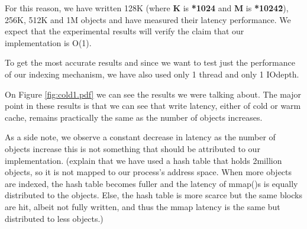 For this reason, we have written 128K (where \textbf{K} is \textbf{*1024} and 
\textbf{M} is \textbf{*1024\^2}), 256K, 512K and 1M objects and have measured 
their latency performance. We expect that the experimental results will verify 
the claim that our implementation is O(1).

To get the most accurate results and since we want to test just the performance 
of our indexing mechanism, we have also used only 1 thread and only 1 IOdepth. 

On Figure \ref{fig:cold1.pdf} we can see the results we were talking about. The 
major point in these results is that we can see that write latency, either of 
cold or warm cache, remains practically the same as the number of objects 
increases.


As a side note, we observe a constant decrease in latency as the number of 
objects increase this is not something that should be attributed to our 
implementation. (explain that we have used a hash table that holds 2million 
objects, so it is not mapped to our process's address space. When more objects 
are indexed, the hash table becomes fuller and the latency of mmap()s is 
equally distributed to the objects. Else, the hash table is more scarce but the 
same blocks are hit, albeit not fully written, and thus the mmap latency is the 
same but distributed to less objects.)

